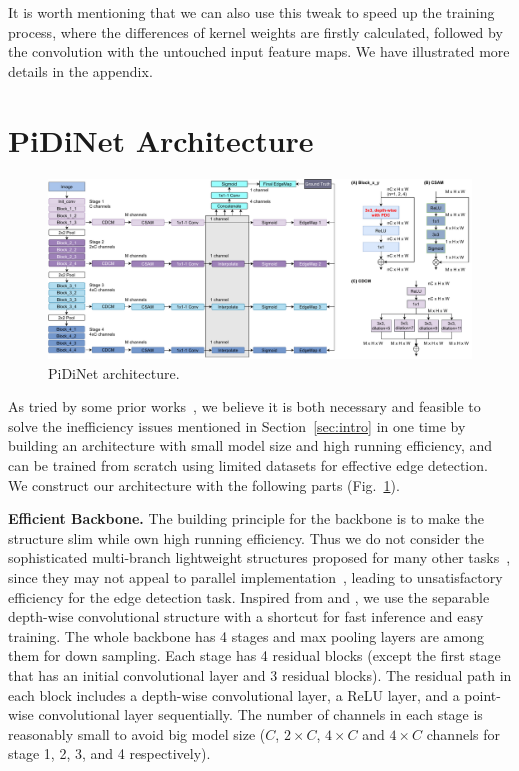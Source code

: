 \documentclass[10pt,twocolumn,letterpaper]{article}
\begin{document}
It is worth mentioning that we can also use this tweak to speed up the training process, where the differences of kernel weights are firstly calculated, followed by the convolution with the untouched input feature maps. We have illustrated more details in the appendix.


\section{PiDiNet Architecture}

\begin{figure}[t!]
    \centering
    \includegraphics[width=0.98\linewidth]{images/arch.pdf}
    \caption{PiDiNet architecture.}
    \label{fig:arch}
\end{figure}


As tried by some prior works~\cite{wibisono2020fined,poma2020dense,wibisono2020traditional}, we believe it is both necessary and feasible to solve the inefficiency issues mentioned in Section~\ref{sec:intro} in one time by building an architecture with small model size and high running efficiency, and can be trained from scratch using limited datasets for effective edge detection. We construct our architecture with the following parts (Fig.~\ref{fig:arch}).

\vspace{0.3em}
\noindent \textbf{Efficient Backbone.} \quad The building principle for the backbone is to make the structure slim while own high running efficiency. Thus we do not consider the sophisticated multi-branch lightweight structures proposed for many other tasks~\cite{gao2020100k,mehta2019espnetv2,yu2018bisenet}, since they may not appeal to parallel implementation~\cite{ma2018shufflenetv2}, leading to unsatisfactory efficiency for the edge detection task. Inspired from \cite{he2016residual} and \cite{howard2017mobilenets}, we use the separable depth-wise convolutional structure with a shortcut for fast inference and easy training. The whole backbone has 4 stages and max pooling layers are among them for down sampling. Each stage has 4 residual blocks (except the first stage that has an initial convolutional layer and 3 residual blocks). The residual path in each block includes a depth-wise convolutional layer, a ReLU layer, and a point-wise convolutional layer sequentially. The number of channels in each stage is reasonably small to avoid big model size ($C$, $2\times C$, $4\times C$ and $4\times C$ channels for stage 1, 2, 3, and 4 respectively).
\end{document}
